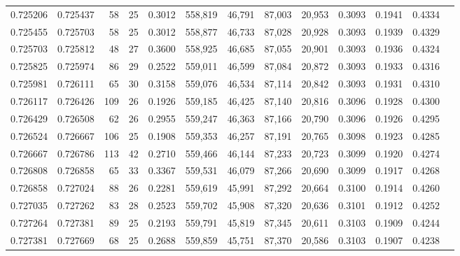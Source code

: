 \begin{tabular}{rrrrrrrrrrrrr}
0.725206 & 0.725437 &     58 &    25 &                                     0.3012 & 558,819 &  46,791 &  87,003 &  20,953 & 0.3093 & 0.1941 & 0.4334 \\
0.725455 & 0.725703 &     58 &    25 &                                     0.3012 & 558,877 &  46,733 &  87,028 &  20,928 & 0.3093 & 0.1939 & 0.4329 \\
0.725703 & 0.725812 &     48 &    27 &                                     0.3600 & 558,925 &  46,685 &  87,055 &  20,901 & 0.3093 & 0.1936 & 0.4324 \\
0.725825 & 0.725974 &     86 &    29 &                                     0.2522 & 559,011 &  46,599 &  87,084 &  20,872 & 0.3093 & 0.1933 & 0.4316 \\
0.725981 & 0.726111 &     65 &    30 &                                     0.3158 & 559,076 &  46,534 &  87,114 &  20,842 & 0.3093 & 0.1931 & 0.4310 \\
0.726117 & 0.726426 &    109 &    26 &                                     0.1926 & 559,185 &  46,425 &  87,140 &  20,816 & 0.3096 & 0.1928 & 0.4300 \\
0.726429 & 0.726508 &     62 &    26 &                                     0.2955 & 559,247 &  46,363 &  87,166 &  20,790 & 0.3096 & 0.1926 & 0.4295 \\
0.726524 & 0.726667 &    106 &    25 &                                     0.1908 & 559,353 &  46,257 &  87,191 &  20,765 & 0.3098 & 0.1923 & 0.4285 \\
0.726667 & 0.726786 &    113 &    42 &                                     0.2710 & 559,466 &  46,144 &  87,233 &  20,723 & 0.3099 & 0.1920 & 0.4274 \\
0.726808 & 0.726858 &     65 &    33 &                                     0.3367 & 559,531 &  46,079 &  87,266 &  20,690 & 0.3099 & 0.1917 & 0.4268 \\
0.726858 & 0.727024 &     88 &    26 &                                     0.2281 & 559,619 &  45,991 &  87,292 &  20,664 & 0.3100 & 0.1914 & 0.4260 \\
0.727035 & 0.727262 &     83 &    28 &                                     0.2523 & 559,702 &  45,908 &  87,320 &  20,636 & 0.3101 & 0.1912 & 0.4252 \\
0.727264 & 0.727381 &     89 &    25 &                                     0.2193 & 559,791 &  45,819 &  87,345 &  20,611 & 0.3103 & 0.1909 & 0.4244 \\
0.727381 & 0.727669 &     68 &    25 &                                     0.2688 & 559,859 &  45,751 &  87,370 &  20,586 & 0.3103 & 0.1907 & 0.4238 \\

\end{tabular}

